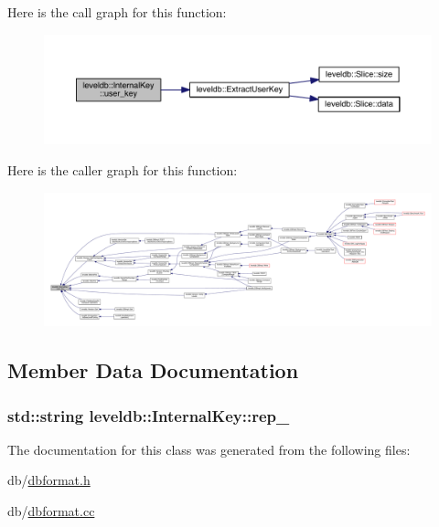 Here is the call graph for this function\+:\nopagebreak
\begin{figure}[H]
\begin{center}
\leavevmode
\includegraphics[width=350pt]{classleveldb_1_1_internal_key_a8eeee76862e806006549784fe21fff61_cgraph}
\end{center}
\end{figure}




Here is the caller graph for this function\+:
\nopagebreak
\begin{figure}[H]
\begin{center}
\leavevmode
\includegraphics[width=350pt]{classleveldb_1_1_internal_key_a8eeee76862e806006549784fe21fff61_icgraph}
\end{center}
\end{figure}




\subsection{Member Data Documentation}
\hypertarget{classleveldb_1_1_internal_key_a8962500b3e5c1f7d2fad13eabdb69368}{}
\subsubsection[{rep\+\_\+}]{\setlength{\rightskip}{0pt plus 5cm}std\+::string leveldb\+::\+Internal\+Key\+::rep\+\_\+\hspace{0.3cm}{\ttfamily [private]}}\label{classleveldb_1_1_internal_key_a8962500b3e5c1f7d2fad13eabdb69368}


The documentation for this class was generated from the following files\+:\begin{DoxyCompactItemize}
\item 
db/\hyperlink{dbformat_8h}{dbformat.\+h}\item 
db/\hyperlink{dbformat_8cc}{dbformat.\+cc}\end{DoxyCompactItemize}
